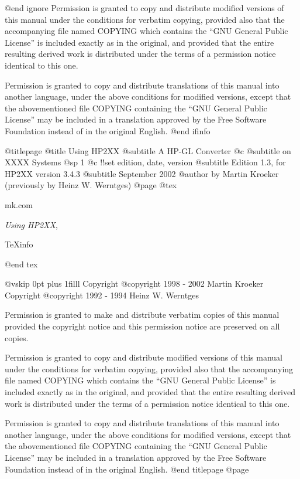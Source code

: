 @end ignore
Permission is granted to copy and distribute modified versions of this
manual under the conditions for verbatim copying, provided also that the
accompanying file named COPYING which contains the ``GNU General Public
License'' is included exactly as in the original, and provided that the
entire resulting derived work is distributed under the terms of a permission
notice identical to this one.

Permission is granted to copy and distribute translations of this manual
into another language, under the above conditions for modified versions,
except that the abovementioned file COPYING containing the
``GNU General Public License'' may be included in a translation approved
by the Free Software Foundation instead of in the original English.
@end ifinfo

@titlepage
@title Using HP2XX
@subtitle A HP-GL Converter
@c @subtitle on XXXX Systems
@sp 1
@c !!set edition, date, version
@subtitle Edition 1.3, for HP2XX version 3.4.3
@subtitle September  2002
@author by Martin Kroeker (previously by Heinz W. Werntges)
@page
@tex
{\parskip=0pt
\hfill mk\@daveg.com\par
\hfill {\it Using HP2XX}, \manvers\par
\hfill \TeX{}info \texinfoversion\par
}
@end tex

@vskip 0pt plus 1filll
Copyright @copyright{} 1998 - 2002 Martin Kroeker
Copyright @copyright{} 1992 - 1994 Heinz W. Werntges

Permission is granted to make and distribute verbatim copies of
this manual provided the copyright notice and this permission notice
are preserved on all copies.

Permission is granted to copy and distribute modified versions of this
manual under the conditions for verbatim copying, provided also that the
accompanying file named COPYING which contains the ``GNU General Public
License'' is included exactly as in the original, and provided that the
entire resulting derived work is distributed under the terms of a permission
notice identical to this one.

Permission is granted to copy and distribute translations of this manual
into another language, under the above conditions for modified versions,
except that the abovementioned file COPYING containing the
``GNU General Public License'' may be included in a translation approved
by the Free Software Foundation instead of in the original English.
@end titlepage
@page


